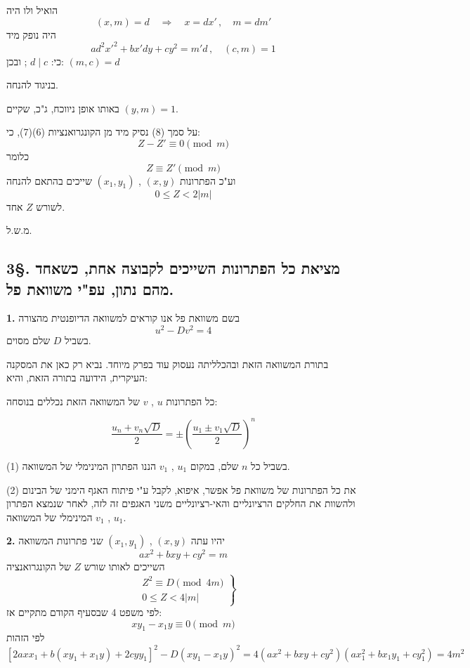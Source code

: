 \noindent הואיל ולו היה
\[ (x,m) = d \quad\Rightarrow\quad x = dx' \, , \quad m = dm' \]
\noindent היה נופק מיד
\[ ad^2x'^2 + bx'dy + cy^2 = m'd \, , \quad (c,m) = 1 \]
\noindent כי: $d \mid c$ ; ובכן: $(m,c) = d$

\noindent בניגוד להנחה.

\noindent באותו אופן ניווכח, ג"כ, שקיים $(y,m) = 1$.

\noindent על סמך (8) נסיק מיד מן הקונגרואנציות (6)(7), כי:
\[ Z - Z' \equiv 0 \pmod{m} \]
\noindent כלומר
\[ Z \equiv Z' \pmod{m} \]
\noindent וע"כ הפתרונות $(x,y)$ , $(x_1,y_1)$ שייכים בהתאם להנחה
\[ 0 \leq Z < 2|m| \]
\noindent לשורש $Z$ אחד.

\medskip
\hfill מ.ש.ל.

\subsection*{3\S. מציאת כל הפתרונות השייכים לקבוצה אחת, כשאחד מהם נתון, עפ"י משוואת פל.}

\noindent\textbf{1.} בשם משוואת פל אנו קוראים למשוואה הדיופנטית מהצורה
\[ u^2 - Dv^2 = 4 \tag{1} \]
\noindent בשביל $D$ שלם מסוים.

\noindent בתורת המשוואה הזאת ובהכלליתה נעסוק עוד בפרק מיוחד. נביא רק כאן את המסקנה העיקרית, הידועה בתורה הזאת, והיא:

\noindent כל הפתרונות $u$ , $v$ של המשוואה הזאת נכללים בנוסחה:

\[ \frac{u_n + v_n\sqrt{D}}{2} = \pm \left( \frac{u_1 \pm v_1\sqrt{D}}{2} \right)^n \tag{2} \]

\noindent בשביל כל $n$ שלם, במקום $u_1$ , $v_1$ הננו הפתרון המינימלי של המשוואה (1).

\noindent את כל הפתרונות של משוואת פל אפשר, איפוא, לקבל ע"י פיתוח האגף הימני של הבינום (2) ולהשוות את החלקים הרציונליים והאי-רציונליים משני האגפים זה לזה, לאחר שנמצא הפתרון $u_1$ , $v_1$ המינימלי של המשוואה.

\noindent\textbf{2.} יהיו עתה $(x,y)$ , $(x_1,y_1)$ שני פתרונות המשוואה
\[ ax^2 + bxy + cy^2 = m \tag{1} \]
\noindent השייכים לאותו שורש $Z$ של הקונגרואנציה
\[ \left. \begin{aligned} & Z^2 \equiv D \pmod{4m} \\ & 0 \leq Z < 4|m| \end{aligned} \right\} \tag{2} \]
\noindent לפי משפט 4 שבסעיף הקודם מתקיים אז:
\[ xy_1 - x_1y \equiv 0 \pmod{m} \tag{3} \]
\noindent לפי הזהות
\[ \left[2axx_1 + b(xy_1+x_1y) + 2cyy_1\right]^2 - D(xy_1-x_1y)^2 = 4(ax^2+bxy+cy^2)(ax_1^2+bx_1y_1+cy_1^2) = 4m^2 \tag{4} \]


